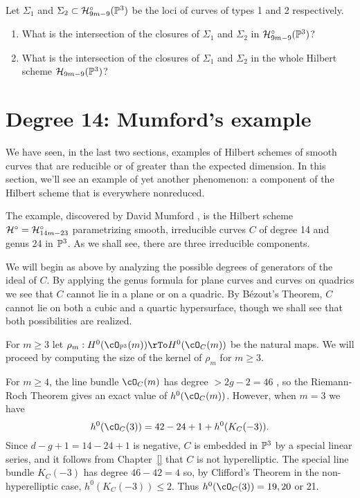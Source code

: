 \begin{exercise}
Let $\Sigma_1$ and $\Sigma_2 \subset \cH^\circ_{9m-9}(\PP^3)$ be the loci of curves of types 1 and 2 respectively. 
\begin{enumerate}
\item What is the intersection of the closures of $\Sigma_1$ and $\Sigma_2$ in $\cH^\circ_{9m-9}(\PP^3)$?
\item What is the intersection of the closures of $\Sigma_1$ and $\Sigma_2$ in the whole Hilbert scheme $\cH_{9m-9}(\PP^3)$?
\end{enumerate}
\end{exercise}

 

\section{Degree 14: Mumford's example}\label{mumford example}

We have seen, in the last two sections, examples of Hilbert schemes of smooth curves that are reducible or of greater than the expected dimension. In this section, we'll see an example of yet another phenomenon: a component of the Hilbert scheme that is everywhere nonreduced. 


The example, discovered by David Mumford \cite{****}, is the  Hilbert scheme
$\cH^\circ = \cH^\circ_{14m-23}$ parametrizing smooth, irreducible curves $C$ of degree 14 and genus 24 in $\PP^3$. As we shall see, there are three irreducible components. 

We will begin as above by analyzing the possible degrees of generators of the ideal of $C$. By applying the genus formula for plane curves and curves on quadrics we see that $C$ cannot lie in a plane or on a quadric. By B\'ezout's Theorem, $C$ cannot lie on both a cubic and a quartic hypersurface, though we shall see that both possibilities are realized.

For $m\geq 3$ let
$
\rho_m : H^0(\cO_{\PP^3}(m)) \rTo H^0(\cO_C(m))
$
be the natural maps.
We will proceed by computing the size of the kernel of $\rho_m$ for $m\geq 3$.

For $m \geq 4$, the line bundle $\cO_C(m)$ has degree $>2g-2 = 46$ , so the Riemann-Roch Theorem gives an exact value of $h^0(\cO_C(m))$.
However, when $m= 3$ we have 
$$
h^0(\cO_C(3)) = 42-24+1+h^0(K_C(-3)).
$$
Since $d-g+1 = 14-24+1$ is negative, $C$ is embedded in $\PP^3$ by a special linear series, and it follows from Chapter~\ref{}  that $C$ is not hyperelliptic. The special line bundle $K_C(-3)$ has degree $46-42 = 4$ so,
by Clifford's Theorem in the non-hyperelliptic case, $h^0(K_C(-3)) \leq 2$. Thus $h^0(\cO_C(3)) = 19, 20$ or 21.

